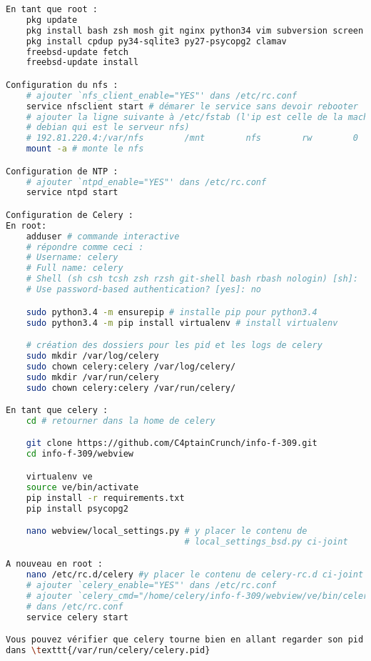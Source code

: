 \documentclass[10pt,a4paper]{article}
\begin{document}
\begin{lstlisting}[language=bash]
En tant que root :
    pkg update
    pkg install bash zsh mosh git nginx python34 vim subversion screen
    pkg install cpdup py34-sqlite3 py27-psycopg2 clamav
    freebsd-update fetch
    freebsd-update install

Configuration du nfs :
    # ajouter `nfs_client_enable="YES"' dans /etc/rc.conf
    service nfsclient start # démarer le service sans devoir rebooter
    # ajouter la ligne suivante à /etc/fstab (l'ip est celle de la machine
    # debian qui est le serveur nfs)
    # 192.81.220.4:/var/nfs        /mnt        nfs        rw        0        0
    mount -a # monte le nfs

Configuration de NTP :
    # ajouter `ntpd_enable="YES"' dans /etc/rc.conf
    service ntpd start

Configuration de Celery :
En root:
    adduser # commande interactive
    # répondre comme ceci :
    # Username: celery
    # Full name: celery
    # Shell (sh csh tcsh zsh rzsh git-shell bash rbash nologin) [sh]:  bash
    # Use password-based authentication? [yes]: no

    sudo python3.4 -m ensurepip # installe pip pour python3.4
    sudo python3.4 -m pip install virtualenv # install virtualenv

    # création des dossiers pour les pid et les logs de celery
    sudo mkdir /var/log/celery
    sudo chown celery:celery /var/log/celery/
    sudo mkdir /var/run/celery
    sudo chown celery:celery /var/run/celery/

En tant que celery :
    cd # retourner dans la home de celery

    git clone https://github.com/C4ptainCrunch/info-f-309.git
    cd info-f-309/webview

    virtualenv ve
    source ve/bin/activate
    pip install -r requirements.txt
    pip install psycopg2

    nano webview/local_settings.py # y placer le contenu de
                                   # local_settings_bsd.py ci-joint

A nouveau en root :
    nano /etc/rc.d/celery #y placer le contenu de celery-rc.d ci-joint
    # ajouter `celery_enable="YES"' dans /etc/rc.conf
    # ajouter `celery_cmd="/home/celery/info-f-309/webview/ve/bin/celery"'
    # dans /etc/rc.conf
    service celery start

Vous pouvez vérifier que celery tourne bien en allant regarder son pid
dans \texttt{/var/run/celery/celery.pid}


\end{lstlisting}
\end{document}

